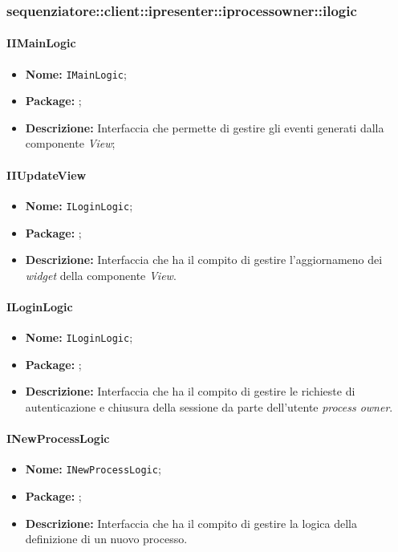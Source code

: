 \subsubsection{sequenziatore::client::ipresenter::iprocessowner::ilogic}
\paragraph{IIMainLogic}
\begin{itemize}
\item \textbf{Nome:} \texttt{IMainLogic};
\item \textbf{Package:} \texttt{\iLogicAdmin{}};
\item \textbf{Descrizione:} Interfaccia che permette di gestire gli eventi generati dalla componente \textit{View};
\end{itemize}

\paragraph{IIUpdateView}
\begin{itemize}
\item \textbf{Nome:} \texttt{ILoginLogic};
\item \textbf{Package:} \texttt{\iLogicAdmin{}};
\item \textbf{Descrizione:} Interfaccia che ha il compito di gestire l'aggiornameno dei \textit{widget} della componente \textit{View}.
\end{itemize}

\paragraph{ILoginLogic}
\begin{itemize}
\item \textbf{Nome:} \texttt{ILoginLogic};
\item \textbf{Package:} \texttt{\iLogicAdmin{}};
\item \textbf{Descrizione:} Interfaccia che ha il compito di gestire le richieste di autenticazione e chiusura della sessione da parte dell'utente \textit{process owner}.
\end{itemize}

\paragraph{INewProcessLogic}
\begin{itemize}
\item \textbf{Nome:} \texttt{INewProcessLogic};
\item \textbf{Package:} \texttt{\iLogicAdmin{}};
\item \textbf{Descrizione:} Interfaccia che ha il compito di gestire la logica della definizione di un nuovo processo.
\end{itemize}


